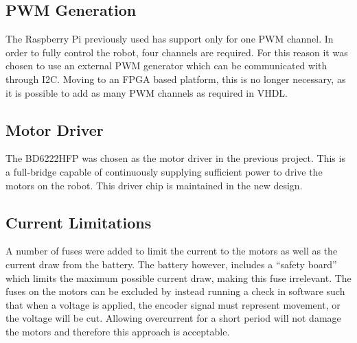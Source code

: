 \subsection{PWM Generation} %
\label{sub:pwm_generation}
The Raspberry Pi previously used has support only for one PWM channel.
In order to fully control the robot, four channels are required.
For this reason it was chosen to use an external PWM generator which can be communicated with through I2C.
Moving to an FPGA based platform, this is no longer necessary, as it is possible to add as many PWM channels as required in VHDL\@.

\subsection{Motor Driver} %
\label{sub:motor_driver}
The BD6222HFP was chosen as the motor driver in the previous project.
This is a full-bridge capable of continuously supplying sufficient power to drive the motors on the robot.
This driver chip is maintained in the new design.

\subsection{Current Limitations} %
\label{sub:power_and_current_limitations}
A number of fuses were added to limit the current to the motors as well as the current draw from the battery.
The battery however, includes a ``safety board'' which limits the maximum possible current draw, making this fuse irrelevant.
The fuses on the motors can be excluded by instead running a check in software such that when a voltage is applied, the encoder signal must represent movement, or the voltage will be cut.
Allowing overcurrent for a short period will not damage the motors and therefore this approach is acceptable.

